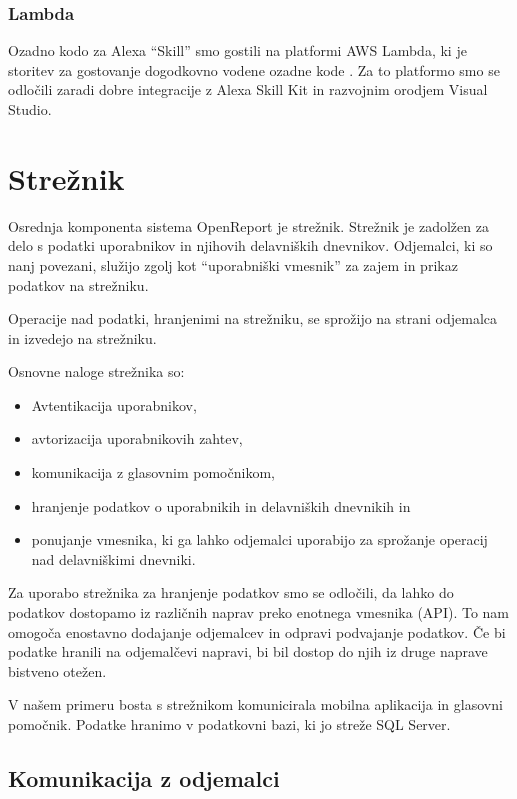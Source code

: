 \documentclass[a4paper, 12pt]{book}
\begin{document}
\subsubsection{Lambda}

Ozadno kodo za Alexa \enquote{Skill} smo gostili na platformi AWS Lambda, ki je storitev za gostovanje dogodkovno vodene ozadne kode \cite{lambda}.
Za to platformo smo se odločili zaradi dobre integracije z Alexa Skill Kit in razvojnim orodjem Visual Studio.

\section{Strežnik}

Osrednja komponenta sistema OpenReport je strežnik.
Strežnik je zadolžen za delo s podatki uporabnikov in njihovih delavniških dnevnikov.
Odjemalci, ki so nanj povezani, služijo zgolj kot \enquote{uporabniški vmesnik} za zajem in prikaz podatkov na strežniku.

Operacije nad podatki, hranjenimi na strežniku, se sprožijo na strani odjemalca in izvedejo na strežniku.

Osnovne naloge strežnika so:
\begin{itemize}
	\item Avtentikacija uporabnikov,
	\item avtorizacija uporabnikovih zahtev,
	\item komunikacija z glasovnim pomočnikom,
	\item hranjenje podatkov o uporabnikih in delavniških dnevnikih in
	\item ponujanje vmesnika, ki ga lahko odjemalci uporabijo za sprožanje operacij nad delavniškimi dnevniki.
\end{itemize}

Za uporabo strežnika za hranjenje podatkov smo se odločili, da lahko do podatkov dostopamo iz različnih naprav preko enotnega vmesnika (API).
To nam omogoča enostavno dodajanje odjemalcev in odpravi podvajanje podatkov.
Če bi podatke hranili na odjemalčevi napravi, bi bil dostop do njih iz druge naprave bistveno otežen.

V našem primeru bosta s strežnikom komunicirala mobilna aplikacija in glasovni pomočnik.
Podatke hranimo v podatkovni bazi, ki jo streže SQL Server.

\subsection{Komunikacija z odjemalci}
\end{document}

